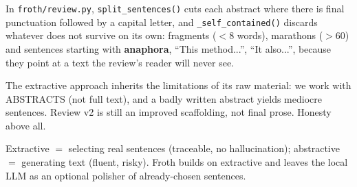 \documentclass[11pt,a4paper]{article}
\begin{document}
In \texttt{froth/review.py}, \texttt{split\_sentences()} cuts each abstract where there is
final punctuation followed by a capital letter, and \texttt{\_self\_contained()} discards
whatever does not survive on its own: fragments ($<$8 words), marathons ($>$60) and sentences
starting with \textbf{anaphora}, ``This method...'', ``It also...'', because they point at a
text the review's reader will never see.

\begin{ojo}
The extractive approach inherits the limitations of its raw material: we work with ABSTRACTS
(not full text), and a badly written abstract yields mediocre sentences. Review v2 is still an
improved scaffolding, not final prose. Honesty above all.
\end{ojo}

\begin{resumen}
Extractive $=$ selecting real sentences (traceable, no hallucination); abstractive $=$
generating text (fluent, risky). Froth builds on extractive and leaves the local LLM as an
optional polisher of already-chosen sentences.
\end{resumen}
\end{document}
